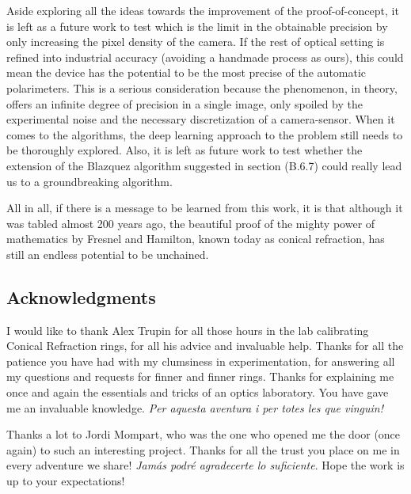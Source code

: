 \documentclass[11pt, a4paper, twoside]{article} %
\begin{document}
Aside exploring all the ideas towards the improvement of the proof-of-concept, it is left as a future work to test which is the limit in the obtainable precision by only increasing the pixel density of the camera. If the rest of optical setting is refined into industrial accuracy (avoiding a handmade process as ours), this could mean the device has the potential to be the most precise of the automatic polarimeters. This is a serious consideration because the phenomenon, in theory, offers an infinite degree of precision in a single image, only spoiled by the experimental noise and the necessary discretization of a camera-sensor. When it comes to the algorithms, the deep learning approach to the problem still needs to be thoroughly explored. Also, it is left as future work to test whether the extension of the Blazquez algorithm suggested in section (B.6.7) could really lead us to a groundbreaking algorithm. \vspace{-0.07cm}

All in all, if there is a message to be learned from this work, it is that although it was tabled almost 200 years ago, the beautiful proof of the mighty  power of mathematics by Fresnel and Hamilton, known today as conical refraction, has still an endless potential to be unchained.

\vspace{-0.15cm}

\subsection*{Acknowledgments \vspace{-0.15cm}}
I would like to thank Alex Trupin for all those hours in the lab calibrating Conical Refraction rings, for all his advice and invaluable help. Thanks for all the patience you have had with my clumsiness in experimentation, for answering all my questions and requests for finner and finner rings. Thanks for explaining me once and again the essentials and tricks of an optics laboratory. You have gave me an invaluable knowledge. {\em Per aquesta aventura i per totes les que vinguin!}\vspace{-0.05cm}

Thanks a lot to Jordi Mompart, who was the one who opened me the door (once again) to such an interesting project. Thanks for all the trust you place on me in every adventure we share! {\em Jamás podré agradecerte lo suficiente}. Hope the work is up to your expectations! \vspace{-0.05cm}
\end{document}
